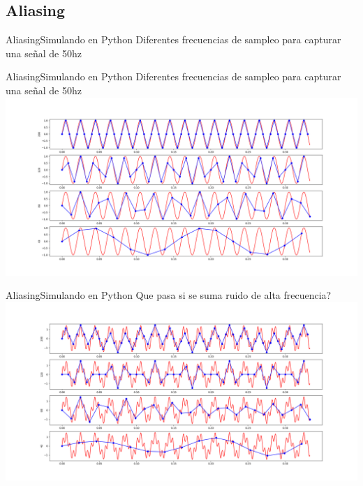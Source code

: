        \subsection{Aliasing}
      \begin{frame}{Aliasing}{Simulando en Python}
         \handsonicon
         Diferentes frecuencias de sampleo para capturar una señal de 50hz
         
         \vfill
      \end{frame}
      \begin{frame}{Aliasing}{Simulando en Python}
         Diferentes frecuencias de sampleo para capturar una señal de 50hz
         \center\includegraphics[width=1.0\textwidth]{1_clase/teorema_sampleo}
         \vfill
      \end{frame}
      \begin{frame}{Aliasing}{Simulando en Python}
         Que pasa si se suma ruido de alta frecuencia?
         \center\includegraphics[width=1.0\textwidth]{1_clase/teorema_sampleo2}
         \vfill
      \end{frame}

